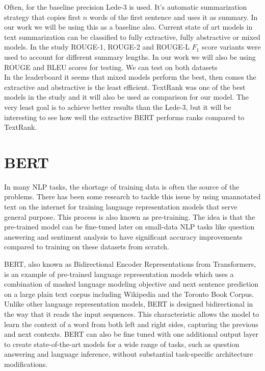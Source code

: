 \documentclass{article}
\begin{document}
Often, for the baseline precision Lede-3 is used. It's automatic summarization strategy that copies first $n$ words of the first sentence and uses it as summary. In our work we will be using this as a baseline also. Current state of art models in text summarization can be classified to fully extractive, fully abstractive or mixed models. In the study \cite{dataset} ROUGE-1, ROUGE-2 and ROUGE-L $F_1$ score variants were used to account for different summary lengths. In our work we will also be using ROUGE and BLEU scores for testing. We can test on both datasets \cite{dataset} \cite{ny_dataset}\\

\noindent
In the leaderboard it seems that mixed models perform the best, then comes the extractive and abstractive is the least efficient. TextRank was one of the best models in the study \cite{dataset} and it will also be used as comparison for our model.
The very least goal is to achieve better results than the Lede-3, but it will be interesting to see how well the extractive BERT performs ranks compared to TextRank. 

\section{BERT }
In many NLP tasks, the shortage of training data is often the source of the problems. There has been some research to tackle this issue by using unannotated text on the internet for training language representation models that serve general purpose. This process is also known as pre-training. The idea is that the pre-trained model can be fine-tuned later on small-data NLP tasks like question answering and sentiment analysis to have significant accuracy improvements compared to training on these datasets from scratch. 

BERT, also known as Bidirectional Encoder Representations from Transformers, is an example of pre-trained language representation models which uses a combination of masked language modeling objective and next sentence prediction on a large plain text corpus including Wikipedia and the Toronto Book Corpus. Unlike other language representation models, BERT is designed bidirectional in the way that it reads the input sequences. This characteristic allows the model to learn the context of a word from both left and right sides, capturing the previous and next contexts. BERT can also be fine tuned with one additional output layer to create state-of-the-art models for a wide range of tasks, such as question answering and language inference, without substantial task-specific architecture modifications. \cite{devlin2019bert}
\end{document}
